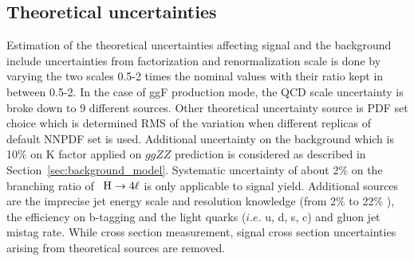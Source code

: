 \subsection{Theoretical uncertainties}
Estimation of the theoretical uncertainties affecting signal and the background include uncertainties from factorization and renormalization scale is done by varying the two scales 0.5-2 times the nominal values with their ratio kept in between 0.5-2.
In the case of ggF production mode, the QCD scale uncertainty is broke down to 9 different sources. %
Other theoretical uncertainty source is PDF set choice which is determined RMS of the variation when different replicas of default NNPDF set is used.
Additional uncertainty on the background which is 10\% on K factor applied on $ggZZ$ prediction is considered as described in Section~\ref{sec:background_model}.
Systematic uncertainty of about 2\% on the branching ratio of ~$\mathrm{H}\rightarrow4\ell$ is only applicable to signal yield. 
Additional sources are the imprecise jet energy scale and resolution knowledge (from 2\% to 22\% ), the efficiency on b-tagging and the light quarks ($i.e.$ u, d, s, c) and gluon jet mistag rate. 
While cross section measurement, signal cross section uncertainties arising from theoretical sources are removed. %

